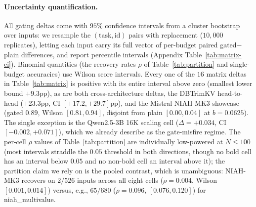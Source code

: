 \paragraph{Uncertainty quantification.} All gating deltas come with $95\%$
confidence intervals from a cluster bootstrap over inputs: we resample the
$(\text{task}, \text{id})$ pairs with replacement ($10{,}000$ replicates),
letting each input carry its full vector of per-budget paired
gated$-$plain differences, and report percentile intervals
(Appendix Table~\ref{tab:matrix-ci}). Binomial quantities (the recovery
rates $\rho$ of Table~\ref{tab:partition} and single-budget accuracies) use
Wilson score intervals. Every one of the $16$ matrix deltas in
Table~\ref{tab:matrix} is positive with its entire interval above zero
(smallest lower bound $+9.3$pp), as are both cross-architecture deltas, the
DBTrimKV head-to-head ($+23.3$pp, CI $[+17.2, +29.7]$pp), and the Mistral
NIAH-MK3 showcase (gated $0.89$, Wilson $[0.81, 0.94]$, disjoint from plain
$[0.00, 0.04]$ at $b = 0.0625$). The single exception is the Qwen2.5-3B 16K
scaling cell ($\Delta = +0.034$, CI $[-0.002, +0.071]$), which we already
describe as the gate-misfire regime. The per-cell $\rho$ values of
Table~\ref{tab:partition} are individually low-powered at $N \le 100$ (most
intervals straddle the $0.05$ threshold in both directions, though no bold
cell has an interval below $0.05$ and no non-bold cell an interval above
it); the partition claim we rely on is the pooled contrast, which is
unambiguous: NIAH-MK3 recovers on $2/526$ inputs across all eight cells
($\rho = 0.004$, Wilson $[0.001, 0.014]$) versus, e.g., $65/680$
($\rho = 0.096$, $[0.076, 0.120]$) for niah\_multivalue.


